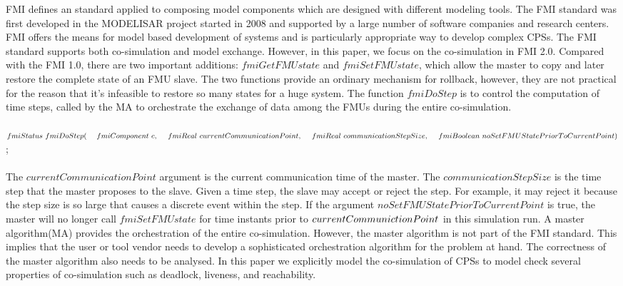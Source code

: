 FMI \cite{BromanBGLMTW13} defines an standard applied to composing model components which are designed with different modeling tools. The FMI standard was first developed in the MODELISAR project started in 2008 and supported by a large number of software companies and research centers. FMI offers the means for model based development of systems and is particularly appropriate way to develop complex CPSs. The FMI standard supports both co-simulation and  model exchange. However, in this paper, we focus on the co-simulation in FMI 2.0.
Compared with the FMI 1.0, there are two important additions: $fmiGetFMUstate$ and $fmiSetFMUstate$, which allow the master to copy and later restore the complete state of an FMU slave. The two functions provide an ordinary mechanism for rollback, however, they are not practical for the reason that it's infeasible to restore so many states for a huge system. The function $fmiDoStep$ is to control the computation of time steps, called by the MA to orchestrate the exchange of data among the FMUs during the entire co-simulation. 
\\
\\
$fmiStatus~fmiDoStep(
\\
~~~~fmiComponent~c,
\\
~~~~fmiReal~currentCommunicationPoint,
\\
~~~~fmiReal~communicationStepSize,
\\
~~~~fmiBoolean~noSetFMUStatePriorToCurrentPoint)$;
\\
\\
The $currentCommunicationPoint$ argument is the current communication time of the master. The $communicationStepSize$ is the time step that the master proposes to the slave. Given a time step, the slave may accept or reject the step. For example, it may reject it because the step size is so large that causes a discrete event within the step. If the argument $noSetFMUStatePriorToCurrentPoint$ is true, the master will no longer call $fmiSetFMUstate$ for time instants prior to $currentCommunic \\ tionPoint$ in this simulation run. A master algorithm(MA)\cite{AckerDVM15} provides the orchestration of the entire co-simulation. However, the master algorithm is not part of the FMI standard. This implies that the user or tool vendor needs to develop a sophisticated orchestration algorithm for the problem at hand. The correctness of the master algorithm also needs to be analysed. In this paper we explicitly model the co-simulation of CPSs to model check several properties of co-simulation such as deadlock, liveness, and reachability. 
